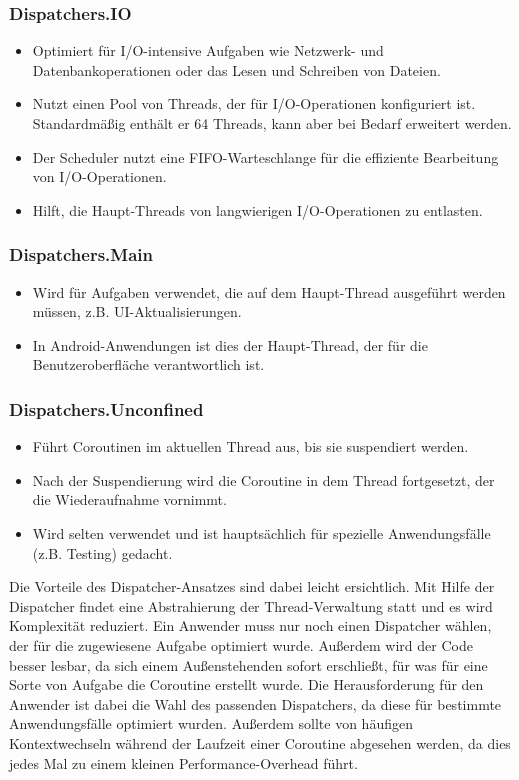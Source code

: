 \documentclass[fontsize=12pt,paper=a4,twoside=semi,parskip=half-,headsepline,headinclude]{scrreprt}
\begin{document}
\subsubsection{Dispatchers.IO}

\begin{itemize}
	\item Optimiert für I/O-intensive Aufgaben wie Netzwerk- und Datenbankoperationen oder das Lesen und Schreiben von Dateien.
	\item Nutzt einen Pool von Threads, der für I/O-Operationen konfiguriert ist.  Standardmäßig enthält er 64 Threads, kann aber bei Bedarf erweitert werden.
	\item Der Scheduler nutzt eine FIFO-Warteschlange für die effiziente Bearbeitung von I/O-Operationen.
	\item Hilft, die Haupt-Threads von langwierigen I/O-Operationen zu entlasten.
\end{itemize}

\subsubsection{Dispatchers.Main}

\begin{itemize}
	\item Wird für Aufgaben verwendet, die auf dem Haupt-Thread ausgeführt werden müssen, z.B. UI-Aktualisierungen.
	\item In Android-Anwendungen ist dies der Haupt-Thread, der für die Benutzeroberfläche verantwortlich ist.
\end{itemize}

\subsubsection{Dispatchers.Unconfined}

\begin{itemize}
	\item Führt Coroutinen im aktuellen Thread aus, bis sie suspendiert werden.
	\item Nach der Suspendierung wird die Coroutine in dem Thread fortgesetzt, der die Wiederaufnahme vornimmt.
	\item Wird selten verwendet und ist hauptsächlich für spezielle Anwendungsfälle (z.B. Testing) gedacht.
\end{itemize}

Die Vorteile des Dispatcher-Ansatzes sind dabei leicht ersichtlich. Mit Hilfe der Dispatcher findet eine Abstrahierung der Thread-Verwaltung statt und es wird Komplexität reduziert. Ein Anwender muss nur noch einen Dispatcher wählen, der für die zugewiesene Aufgabe optimiert wurde. Außerdem wird der Code besser lesbar, da sich einem Außenstehenden sofort erschließt, für was für eine Sorte von Aufgabe die Coroutine erstellt wurde. Die Herausforderung für den Anwender ist dabei die Wahl des passenden Dispatchers, da diese für bestimmte Anwendungsfälle optimiert wurden. Außerdem sollte von häufigen Kontextwechseln während der Laufzeit einer Coroutine abgesehen werden, da dies jedes Mal zu einem kleinen  Performance-Overhead führt.
\end{document}
